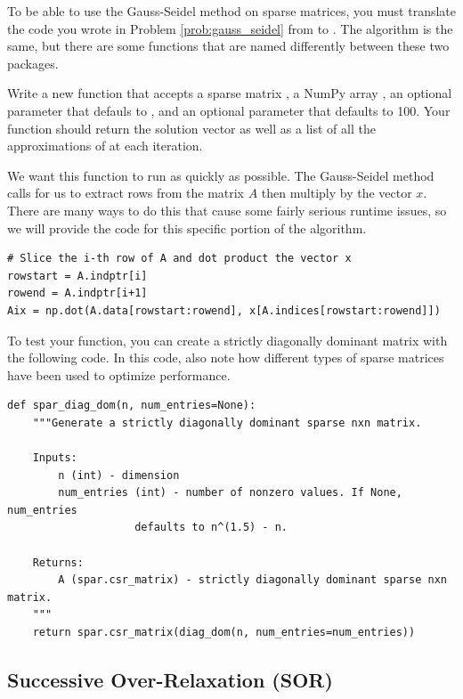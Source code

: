 \begin{problem} %
To be able to use the Gauss-Seidel method on sparse matrices, you must translate
the code you wrote in Problem \ref{prob:gauss_seidel} from  to .
The algorithm is the same, but there are some functions that are named differently
between these two packages.

Write a new function that accepts a sparse matrix , a NumPy array ,
an optional parameter  that defauls to , and an optional parameter
 that defaults to 100. Your function should return the solution
vector  as well as a list of all the approximations of  at each
iteration.

We want this function to run as quickly as possible. The Gauss-Seidel method calls for us to extract rows from the matrix $A$ then multiply by the vector $x$. There are many ways to do this that cause some fairly serious runtime issues, so we will provide the code for this specific portion of the algorithm.

\begin{lstlisting}
# Slice the i-th row of A and dot product the vector x
rowstart = A.indptr[i]
rowend = A.indptr[i+1]
Aix = np.dot(A.data[rowstart:rowend], x[A.indices[rowstart:rowend]])
\end{lstlisting}

To test your function, you can create a strictly diagonally dominant matrix with
the following code. In this code, also note how different types of sparse matrices
have been used to optimize performance.

\begin{lstlisting}
def spar_diag_dom(n, num_entries=None):
    """Generate a strictly diagonally dominant sparse nxn matrix.

    Inputs:
        n (int) - dimension
        num_entries (int) - number of nonzero values. If None, num_entries
                    defaults to n^(1.5) - n.

    Returns:
        A (spar.csr_matrix) - strictly diagonally dominant sparse nxn matrix.
    """
    return spar.csr_matrix(diag_dom(n, num_entries=num_entries))
\end{lstlisting}

\end{problem}

\subsection*{Successive Over-Relaxation (SOR)} %

